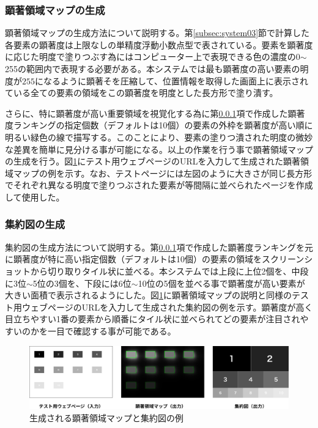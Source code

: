 \subsubsection{顕著領域マップの生成}\label{subsec:system04-1}
\par 顕著領域マップの生成方法について説明する。第\ref{subsec:system03}節で計算した各要素の顕著度は上限なしの単精度浮動小数点型で表されている。要素を顕著度に応じた明度で塗りつぶす為にはコンピューター上で表現できる色の濃度の0$\sim$255の範囲内で表現する必要がある。本システムでは最も顕著度の高い要素の明度が$255$になるように顕著そを圧縮して、位置情報を取得した画面上に表示されている全ての要素の領域をこの顕著度を明度とした長方形で塗り潰す。

\par さらに、特に顕著度が高い重要領域を視覚化する為に第\ref{subsec:system04-1}項で作成した顕著度ランキングの指定個数（デフォルトは10個）の要素の外枠を顕著度が高い順に明るい緑色の線で描写する。このことにより、要素の塗りつ潰された明度の微妙な差異を簡単に見分ける事が可能になる。以上の作業を行う事で顕著領域マップの生成を行う。図\ref{fig_output-example}にテスト用ウェブページのURLを入力して生成された顕著領域マップの例を示す。なお、テストページには左図のように大きさが同じ長方形でそれぞれ異なる明度で塗りつぶされた要素が等間隔に並べられたページを作成して使用した。

\subsubsection{集約図の生成}\label{subsec:system04-2}
\par 集約図の生成方法について説明する。第\ref{subsec:system04-1}項で作成した顕著度ランキングを元に顕著度が特に高い指定個数（デフォルトは10個）の要素の領域をスクリーンショットから切り取りタイル状に並べる。本システムでは上段に上位2個を、中段に3位$\sim$5位の3個を、下段には6位$\sim$10位の5個を並べる事で顕著度が高い要素が大きい面積で表示されるようにした。図\ref{fig_output-example}に顕著領域マップの説明と同様のテスト用ウェブページのURLを入力して生成された集約図の例を示す。顕著度が高く目立ちやすい1番の要素から順番にタイル状に並べられてどの要素が注目されやすいのかを一目で確認する事が可能である。

\begin{figure}[H]
  \centering
  \includegraphics[width=12.5cm]{figures/06_example-output.png}
  \caption{生成される顕著領域マップと集約図の例}
  \label{fig_output-example}
\end{figure}
